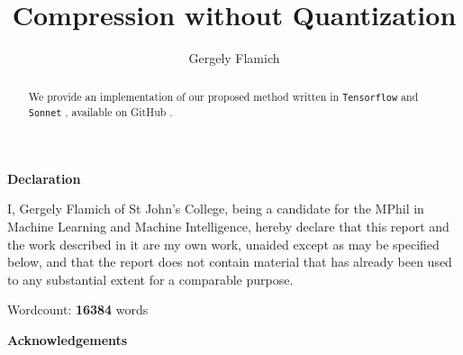 \documentclass{article}
\title{Compression without Quantization}
\author{Gergely Flamich}
\begin{document}


%
%

\vspace{2cm}

\begin{center}
\Huge
\textbf{Declaration}
\end{center}

\vspace{1cm}

\large
\noindent I, Gergely Flamich of St John's College, being a candidate for the
MPhil in Machine Learning and Machine Intelligence, hereby declare that this
report and the work described in it are my own work, unaided except as may be
specified below, and that the report does not contain material that has
already been used to any substantial extent for a comparable purpose.


\vspace{2cm}

\large
\noindent
Wordcount: \textbf{16384} words

\newpage

%
%

\vspace{2cm}

\begin{center}
\Huge
\textbf{Acknowledgements}
\end{center}

\vspace{1cm}



\newpage

%
%

\begin{abstract}
  We provide an implementation of our proposed method written in \texttt{Tensorflow}
  \cite{tensorflow2015-whitepaper} and \texttt{Sonnet} \cite{sonnetblog},
  available on GitHub \footnotemark.
\end{abstract}

\end{document}
